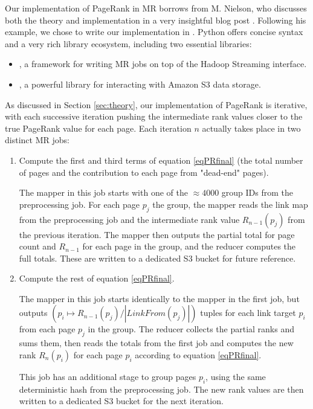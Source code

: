 Our implementation of PageRank in MR borrows from M. Nielson, who
discusses both the theory and implementation in a very insightful blog post \cite{mnielsen}.
Following his example, we chose to write our implementation in .
Python offers concise syntax and a very rich library ecosystem, including two
essential libraries: 
\begin{itemize}
\item {}, a framework for writing MR jobs on top of the Hadoop Streaming interface.
\item {}, a powerful library for interacting with Amazon S3 data storage.
\end{itemize}

As discussed in Section \ref{sec:theory}, our implementation of PageRank is 
iterative, with each successive iteration pushing the intermediate rank values 
closer to the true PageRank value for each page. 
Each iteration $n$ actually takes place in two distinct MR jobs:
\begin{enumerate}
\item Compute the first and third terms of equation \eqref{eqPRfinal} (the total 
    number of pages and the contribution to each page from "dead-end" pages).

    The mapper in this job starts with one of the $\approx4000$ group IDs from the 
    preprocessing job.  For each page $p_j$ the group, the mapper reads the 
    link map from the preprocessing job and the intermediate rank value 
    $R_{n-1}(p_j)$ from the previous iteration.  The mapper then outputs the partial 
    total for page count and $R_{n-1}$ for each page in the group, and the 
    reducer computes the full totals.  These are written to a dedicated S3 
    bucket for future reference.
    
\item Compute the rest of equation \eqref{eqPRfinal}.
    
    The mapper in this job starts identically to the mapper in the first job, but 
    outputs $(p_i \mapsto R_{n-1}(p_j) / |LinkFrom(p_j)| )$ tuples for each 
    link target $p_i$ from each page $p_j$ in the group.  The reducer collects
    the partial ranks and sums them, then reads the totals from the first job
    and computes the new rank $R_n(p_i)$ for each page $p_i$ according to
    equation \eqref{eqPRfinal}.
    
    This job has an additional stage to group pages $p_i$, using the same 
    deterministic hash from the preprocessing job.  The new rank values are 
    then written to a dedicated S3 bucket for the next iteration.
\end{enumerate}

